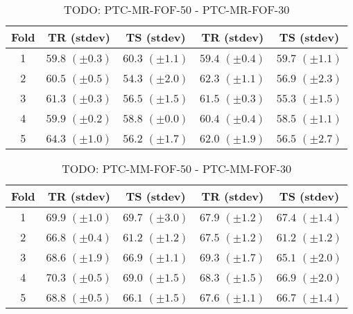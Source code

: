 \documentclass[10pt,a4paper]{book}
\begin{document}
\begin{table}[tbph]
\caption{TODO: PTC-MR-FOF-50 - PTC-MR-FOF-30}
\label{TODO}
\centering
\begin{tabular}{c*{4}{c}}
\toprule
Fold & TR (stdev) & TS (stdev) & TR (stdev) & TS (stdev)\\
\midrule
1 & $59.8$ $(\pm 0.3)$ & $60.3$ $(\pm 1.1)$ & $59.4$ $(\pm 0.4)$ & $59.7$ $(\pm 1.1)$\\
2 & $60.5$ $(\pm 0.5)$ & $54.3$ $(\pm 2.0)$ & $62.3$ $(\pm 1.1)$ & $56.9$ $(\pm 2.3)$\\
3 & $61.3$ $(\pm 0.3)$ & $56.5$ $(\pm 1.5)$ & $61.5$ $(\pm 0.3)$ & $55.3$ $(\pm 1.5)$\\
4 & $59.9$ $(\pm 0.2)$ & $58.8$ $(\pm 0.0)$ & $60.4$ $(\pm 0.4)$ & $58.5$ $(\pm 1.1)$\\
5 & $64.3$ $(\pm 1.0)$ & $56.2$ $(\pm 1.7)$ & $62.0$ $(\pm 1.9)$ & $56.5$ $(\pm 2.7)$\\
\bottomrule
\end{tabular}
\end{table}



\begin{table}[tbph]
\caption{TODO: PTC-MM-FOF-50 - PTC-MM-FOF-30}
\label{TODO}
\centering
\begin{tabular}{c*{4}{c}}
\toprule
Fold & TR (stdev) & TS (stdev) & TR (stdev) & TS (stdev)\\
\midrule
1 & $69.9$ $(\pm 1.0)$ & $69.7$ $(\pm 3.0)$ & $67.9$ $(\pm 1.2)$ & $67.4$ $(\pm 1.4)$\\
2 & $66.8$ $(\pm 0.4)$ & $61.2$ $(\pm 1.2)$ & $67.5$ $(\pm 1.2)$ & $61.2$ $(\pm 1.2)$\\
3 & $68.6$ $(\pm 1.9)$ & $66.9$ $(\pm 1.1)$ & $69.3$ $(\pm 1.7)$ & $65.1$ $(\pm 2.0)$\\
4 & $70.3$ $(\pm 0.5)$ & $69.0$ $(\pm 1.5)$ & $68.3$ $(\pm 1.5)$ & $66.9$ $(\pm 2.0)$\\
5 & $68.8$ $(\pm 0.5)$ & $66.1$ $(\pm 1.5)$ & $67.6$ $(\pm 1.1)$ & $66.7$ $(\pm 1.4)$\\
\bottomrule
\end{tabular}
\end{table}


\end{document}
